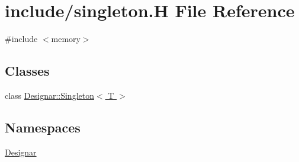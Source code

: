 \hypertarget{singleton_8_h}{}\section{include/singleton.H File Reference}
\label{singleton_8_h}
{\ttfamily \#include $<$memory$>$}\newline
\subsection*{Classes}
\begin{DoxyCompactItemize}
\item 
class \hyperlink{class_designar_1_1_singleton}{Designar\+::\+Singleton$<$ T $>$}
\end{DoxyCompactItemize}
\subsection*{Namespaces}
\begin{DoxyCompactItemize}
\item 
 \hyperlink{namespace_designar}{Designar}
\end{DoxyCompactItemize}
